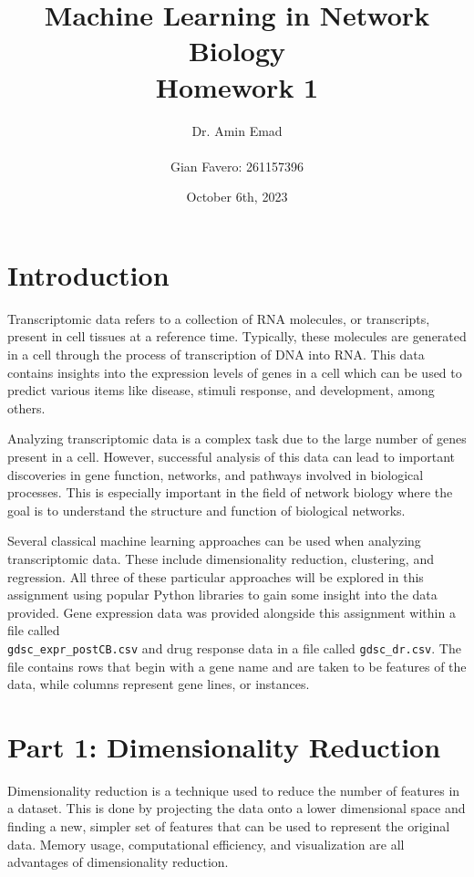 \documentclass[12pt]{article}
\begin{document}
\title{Machine Learning in Network Biology\\Homework 1}
\author{
        Dr. Amin Emad \\ \\
        Gian Favero: 261157396 \\
}
\date{October 6th, 2023}
\maketitle
\newpage

\tableofcontents
\newpage

\section{Introduction}
Transcriptomic data refers to a collection of RNA molecules, or transcripts, present in cell tissues at a reference time. Typically, these molecules are generated in a cell through the process of transcription of DNA into RNA. This data contains insights into the expression levels of genes in a cell which can be used to predict various items like disease, stimuli response, and development, among others.

Analyzing transcriptomic data is a complex task due to the large number of genes present in a cell. However, successful analysis of this data can lead to important discoveries in gene function, networks, and pathways involved in biological processes. This is especially important in the field of network biology where the goal is to understand the structure and function of biological networks.

Several classical machine learning approaches can be used when analyzing transcriptomic data. These include dimensionality reduction, clustering, and regression. All three of these particular approaches will be explored in this assignment using popular Python libraries to gain some insight into the data provided. Gene expression data was provided alongside this assignment within a file called \\ \verb|gdsc_expr_postCB.csv| and drug response data in a file called \verb|gdsc_dr.csv|. The file contains rows that begin with a gene name and are taken to be features of the data, while columns represent gene lines, or instances. 

\section{Part 1: Dimensionality Reduction}
Dimensionality reduction is a technique used to reduce the number of features in a dataset. This is done by projecting the data onto a lower dimensional space and finding a new, simpler set of features that can be used to represent the original data. Memory usage, computational efficiency, and visualization are all advantages of dimensionality reduction.
\end{document}
